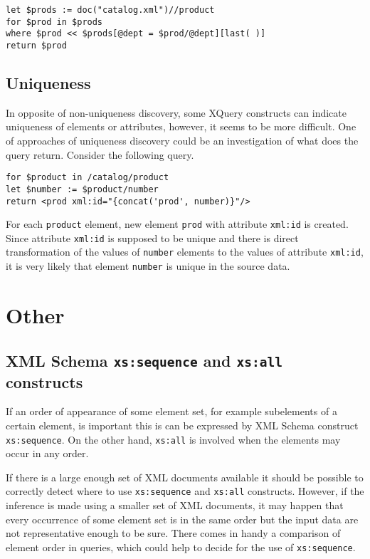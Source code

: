 \begin{verbatim}
let $prods := doc("catalog.xml")//product 
for $prod in $prods 
where $prod << $prods[@dept = $prod/@dept][last( )] 
return $prod 
\end{verbatim}

\subsection{Uniqueness}
In opposite of non-uniqueness discovery, some XQuery constructs can indicate uniqueness of elements or attributes, however, it seems to be more difficult. One of approaches of uniqueness discovery could be an investigation of what does the query return. Consider the following query.

\begin{verbatim}
for $product in /catalog/product
let $number := $product/number
return <prod xml:id="{concat('prod', number)}"/>
\end{verbatim}

For each \texttt{product} element, new element \texttt{prod} with attribute \texttt{xml:id} is created. Since attribute \texttt{xml:id} is supposed to be unique and there is direct transformation of the values of \texttt{number} elements to the values of attribute \texttt{xml:id}, it is very likely that element \texttt{number} is unique in the source data.

\section{Other}

\subsection{XML Schema \texttt{xs:sequence} and \texttt{xs:all} constructs}
If an order of appearance of some element set, for example subelements of a certain element, is important this is can be expressed by XML Schema construct \texttt{xs:sequence}. On the other hand, \texttt{xs:all} is involved when the elements may occur in any order.

If there is a large enough set of XML documents available it should be possible to correctly detect where to use \texttt{xs:sequence} and \texttt{xs:all} constructs. However, if the inference is made using a smaller set of XML documents, it may happen that every occurrence of some element set is in the same order but the input data are not representative enough to be sure. There comes in handy a comparison of element order in queries, which could help to decide for the use of \texttt{xs:sequence}.

